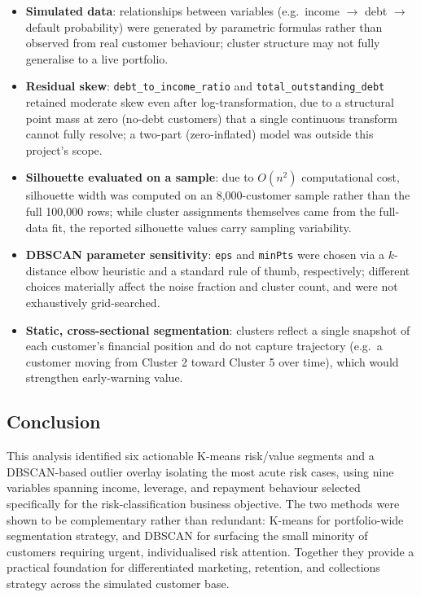 \documentclass[11pt]{article}
\begin{document}
\begin{itemize}[leftmargin=1.4em]
  \item \textbf{Simulated data}: relationships between variables (e.g.\ income $\to$ debt $\to$ default probability) were generated by parametric formulas rather than observed from real customer behaviour; cluster structure may not fully generalise to a live portfolio.
  \item \textbf{Residual skew}: \texttt{debt\_to\_income\_ratio} and \texttt{total\_outstanding\_debt} retained moderate skew even after log-transformation, due to a structural point mass at zero (no-debt customers) that a single continuous transform cannot fully resolve; a two-part (zero-inflated) model was outside this project's scope.
  \item \textbf{Silhouette evaluated on a sample}: due to $O(n^2)$ computational cost, silhouette width was computed on an 8{,}000-customer sample rather than the full 100{,}000 rows; while cluster assignments themselves came from the full-data fit, the reported silhouette values carry sampling variability.
  \item \textbf{DBSCAN parameter sensitivity}: \texttt{eps} and \texttt{minPts} were chosen via a $k$-distance elbow heuristic and a standard rule of thumb, respectively; different choices materially affect the noise fraction and cluster count, and were not exhaustively grid-searched.
  \item \textbf{Static, cross-sectional segmentation}: clusters reflect a single snapshot of each customer's financial position and do not capture trajectory (e.g.\ a customer moving from Cluster 2 toward Cluster 5 over time), which would strengthen early-warning value.
\end{itemize}

\subsection{Conclusion}

This analysis identified six actionable K-means risk/value segments and a DBSCAN-based outlier overlay isolating the most acute risk cases, using nine variables spanning income, leverage, and repayment behaviour selected specifically for the risk-classification business objective. The two methods were shown to be complementary rather than redundant: K-means for portfolio-wide segmentation strategy, and DBSCAN for surfacing the small minority of customers requiring urgent, individualised risk attention. Together they provide a practical foundation for differentiated marketing, retention, and collections strategy across the simulated customer base.
\end{document}
